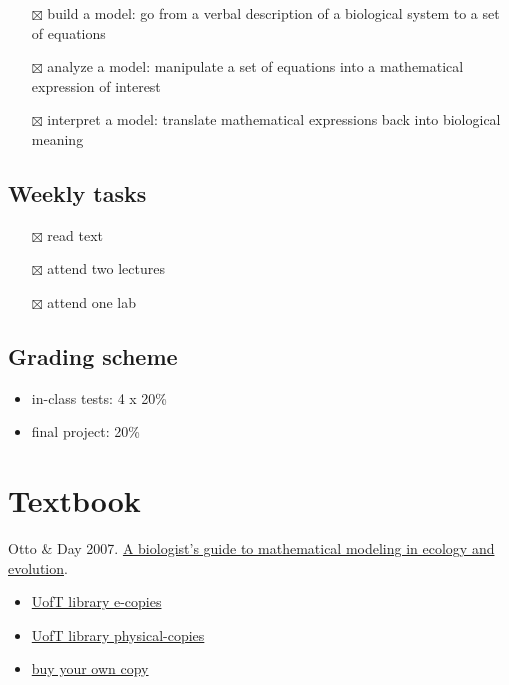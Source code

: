 \documentclass[
]{article}
\providecommand{\tightlist}{%
  \setlength{\itemsep}{0pt}\setlength{\parskip}{0pt}}
\begin{document}
\begin{itemize}
\tightlist
\item[$\boxtimes$]
  build a model: go from a verbal description of a biological system to
  a set of equations
\item[$\boxtimes$]
  analyze a model: manipulate a set of equations into a mathematical
  expression of interest
\item[$\boxtimes$]
  interpret a model: translate mathematical expressions back into
  biological meaning
\end{itemize}

\subsection{Weekly tasks}\label{weekly-tasks}

\begin{itemize}
\tightlist
\item[$\boxtimes$]
  read text
\item[$\boxtimes$]
  attend two lectures
\item[$\boxtimes$]
  attend one lab
\end{itemize}

\subsection{Grading scheme}\label{grading-scheme}

\begin{itemize}
\tightlist
\item
  in-class tests: 4 x 20\%
\item
  final project: 20\%
\end{itemize}

\section{Textbook}\label{textbook}

Otto \& Day 2007. \href{https://www.zoology.ubc.ca/biomath/}{A
biologist's guide to mathematical modeling in ecology and evolution}.

\begin{itemize}
\tightlist
\item
  \href{https://librarysearch.library.utoronto.ca/permalink/01UTORONTO_INST/14bjeso/alma991106921343406196}{UofT
  library e-copies}
\item
  \href{https://librarysearch.library.utoronto.ca/permalink/01UTORONTO_INST/14bjeso/alma991106624476006196}{UofT
  library physical-copies}
\item
  \href{https://press.princeton.edu/books/hardcover/9780691123448/a-biologists-guide-to-mathematical-modeling-in-ecology-and-evolution}{buy
  your own copy}
\end{itemize}
\end{document}
